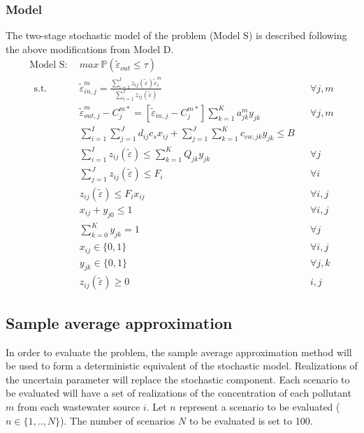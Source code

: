 \documentclass[preprint,12pt,authoryear]{elsarticle}
\newcommand{\bP}{\mathbb P}
\begin{document}
\subsubsection{Model}
\setcounter{equation}{0}
The two-stage stochastic model of the problem (Model S) is described following the above modifications from Model D.
\begin{align}
	\text{Model S}:~~&max~\bP(\tilde{\varepsilon}_{out} \leq \tau) \nonumber\\~~
	\mbox{s.t.}~~
	&\tilde{\varepsilon}_{in,j}^m = \frac{\sum_{i=1}^I z_{ij}(\tilde{\varepsilon}) \tilde{\varepsilon}_i^m}{\sum_{i=1}^I z_{ij}(\tilde{\varepsilon})} && \forall j,m\label{constraint:inf}\\
	&\tilde{\varepsilon}_{out,j}^m - C_j^{m*} = [\tilde{\varepsilon}_{in,j} - C_j^{m*}] \sum_{k=1}^K a_{jk}^m y_{jk} && \forall j,m\label{constraint:eff}\\
	&\sum_{i=1}^I \sum_{j=1}^J d_{ij} c_s x_{ij} + \sum_{j=1}^J \sum_{k=1}^K c_{cw,jk} y_{jk} \leq B \\
	&\sum_{i=1}^I z_{ij} (\tilde{\varepsilon}) \leq \sum_{k=1}^K Q_{jk} y_{jk} && \forall j\\
	&\sum_{j=1}^J z_{ij} (\tilde{\varepsilon}) \leq F_i && \forall i\\
	&z_{ij} (\tilde{\varepsilon}) \leq F_i x_{ij} && \forall i,j\\
	&x_{ij} + y_{j0} \leq 1 && \forall i,j\\
	&\sum_{k=0}^K y_{jk} = 1 && \forall j \\
	&x_{ij} \in \{0, 1\} && \forall i,j\\
	&y_{jk} \in \{0, 1\} && \forall j,k\\
	&z_{ij}(\tilde{\varepsilon}) \geq 0 && i,j 
\end{align}
\renewcommand{\theequation}{\thesection--\arabic{equation}}
\subsection{Sample average approximation}
%
In order to evaluate the problem, the sample average approximation method will be used to form a deterministic equivalent of the stochastic model. Realizations of the uncertain parameter will replace the stochastic component. Each scenario to be evaluated will have a set of realizations of the concentration of each pollutant $m$ from each wastewater source $i$. Let $n$ represent a scenario to be evaluated ($n \in \{1,..,N\}$). The number of scenarios $N$ to be evaluated is set to 100. 
\end{document}
